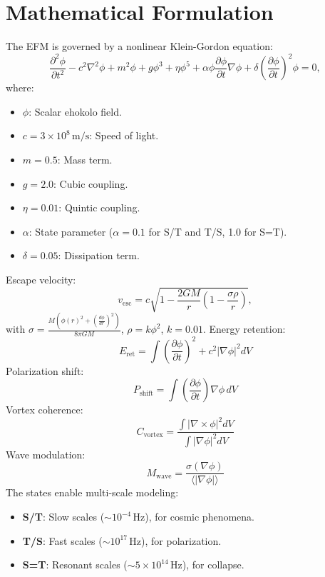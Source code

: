 \documentclass[11pt]{article}
\begin{document}
\section{Mathematical Formulation}
The EFM is governed by a nonlinear Klein-Gordon equation:
\begin{equation}
\frac{\partial^2 \phi}{\partial t^2} - c^2 \nabla^2 \phi + m^2 \phi + g \phi^3 + \eta \phi^5 + \alpha \phi \frac{\partial \phi}{\partial t} \nabla \phi + \delta \left(\frac{\partial \phi}{\partial t}\right)^2 \phi = 0,
\end{equation}
where:
\begin{itemize}
    \item \(\phi\): Scalar ehokolo field.
    \item \(c = 3 \times 10^8 \, \text{m/s}\): Speed of light.
    \item \(m = 0.5\): Mass term.
    \item \(g = 2.0\): Cubic coupling.
    \item \(\eta = 0.01\): Quintic coupling.
    \item \(\alpha\): State parameter (\(\alpha = 0.1\) for S/T and T/S, 1.0 for S=T).
    \item \(\delta = 0.05\): Dissipation term.
\end{itemize}
Escape velocity:
\begin{equation}
v_{\text{esc}} = c \sqrt{1 - \frac{2 G M}{r} \left( 1 - \frac{\sigma \rho}{r} \right)},
\end{equation}
with \(\sigma = \frac{M \left( \phi(r)^2 + \left( \frac{d\phi}{dr} \right)^2 \right)}{8 \pi G M}\),
\(\rho = k \phi^2\), \(k = 0.01\). Energy retention:
\begin{equation}
E_{\text{ret}} = \int \left( \frac{\partial \phi}{\partial t} \right)^2 + c^2 |\nabla \phi|^2 dV
\end{equation}
Polarization shift:
\begin{equation}
P_{\text{shift}} = \int \left( \frac{\partial \phi}{\partial t} \right) \nabla \phi \, dV
\end{equation}
Vortex coherence:
\begin{equation}
C_{\text{vortex}} = \frac{\int |\nabla \times \phi|^2 dV}{\int |\nabla \phi|^2 dV}
\end{equation}
Wave modulation:
\begin{equation}
M_{\text{wave}} = \frac{\sigma(\nabla \phi)}{\langle |\nabla \phi| \rangle}
\end{equation}
The states enable multi-scale modeling:
\begin{itemize}
    \item \textbf{S/T}: Slow scales (\(\sim 10^{-4} \, \text{Hz}\)), for cosmic phenomena.
    \item \textbf{T/S}: Fast scales (\(\sim 10^{17} \, \text{Hz}\)), for polarization.
    \item \textbf{S=T}: Resonant scales (\(\sim 5 \times 10^{14} \, \text{Hz}\)), for collapse.
\end{itemize}
\end{document}
